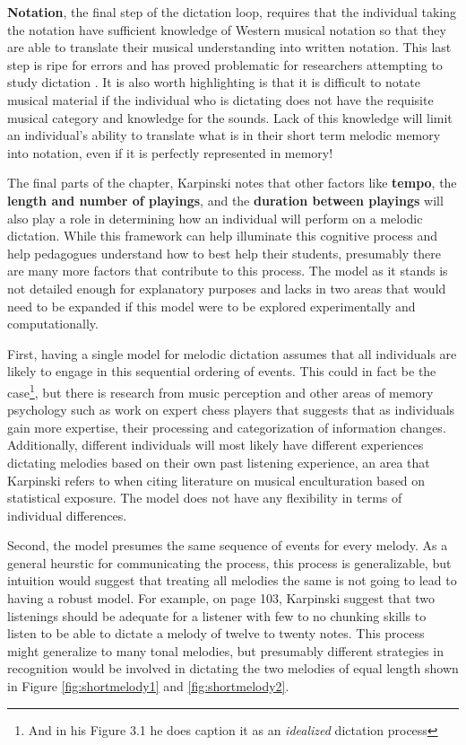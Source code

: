 \documentclass[]{book}
\let\rmarkdownfootnote\footnote%
\def\footnote{\protect\rmarkdownfootnote}
\begin{document}
\textbf{Notation}, the final step of the dictation loop, requires that the individual taking the notation have sufficient knowledge of Western musical notation so that they are able to translate their musical understanding into written notation.
This last step is ripe for errors and has proved problematic for researchers attempting to study dictation \citep{taylorStrategiesMemoryShort1983, klonoskiImprovingDictationAuralSkills2006}.
It is also worth highlighting is that it is difficult to notate musical material if the individual who is dictating does not have the requisite musical category and knowledge for the sounds.
Lack of this knowledge will limit an individual's ability to translate what is in their short term melodic memory into notation, even if it is perfectly represented in memory!

The final parts of the chapter, Karpinski notes that other factors like \textbf{tempo}, the \textbf{length and number of playings}, and the \textbf{duration between playings} will also play a role in determining how an individual will perform on a melodic dictation.
While this framework can help illuminate this cognitive process and help pedagogues understand how to best help their students, presumably there are many more factors that contribute to this process.
The model as it stands is not detailed enough for explanatory purposes and lacks in two areas that would need to be expanded if this model were to be explored experimentally and computationally.

First, having a single model for melodic dictation assumes that all individuals are likely to engage in this sequential ordering of events.
This could in fact be the case\footnote{And in his Figure 3.1 he does caption it as an \emph{idealized} dictation process}, but there is research from music perception \citep{goldmanImprovisationExperiencePredicts2018a} and other areas of memory psychology such as work on expert chess players \citep{laneChessKnowledgePredicts2018} that suggests that as individuals gain more expertise, their processing and categorization of information changes.
Additionally, different individuals will most likely have different experiences dictating melodies based on their own past listening experience, an area that Karpinski refers to when citing literature on musical enculturation based on statistical exposure.
The model does not have any flexibility in terms of individual differences.

Second, the model presumes the same sequence of events for every melody.
As a general heurstic for communicating the process, this process is generalizable, but intuition would suggest that treating all melodies the same is not going to lead to having a robust model.
For example, on page 103, Karpinski suggest that two listenings should be adequate for a listener with few to no chunking skills to listen to be able to dictate a melody of twelve to twenty notes.
This process might generalize to many tonal melodies, but presumably different strategies in recognition would be involved in dictating the two melodies of equal length shown in Figure \ref{fig:shortmelody1} and \ref{fig:shortmelody2}.
\end{document}
